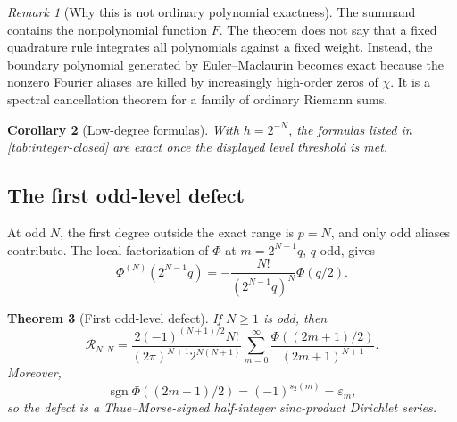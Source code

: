 \documentclass[11pt,oneside]{article}
\numberwithin{equation}{section}
\newtheorem{theorem}{Theorem}[section]
\newtheorem{corollary}[theorem]{Corollary}
\theoremstyle{definition}
\theoremstyle{remark}
\newtheorem{remark}[theorem]{Remark}
\newcommand{\wt}{s_2}
\newcommand{\defect}{\mathcal R}
\DeclareMathOperator{\sgn}{sgn}
\begin{document}
\begin{remark}[Why this is not ordinary polynomial exactness]
The summand contains the nonpolynomial function \(F\).  The theorem does not say that a
fixed quadrature rule integrates all polynomials against a fixed weight.  Instead, the
boundary polynomial generated by Euler--Maclaurin becomes exact because the nonzero
Fourier aliases are killed by increasingly high-order zeros of \(\chi\).  It is a
spectral cancellation theorem for a family of ordinary Riemann sums.
\end{remark}

\begin{corollary}[Low-degree formulas]\label{cor:low-degree}
With \(h=2^{-N}\), the formulas listed in \cref{tab:integer-closed} are exact once the displayed level threshold is met.
\end{corollary}

\begin{table}[H]
\centering
\small
\resizebox{\textwidth}{!}{}
\caption{Exact Euler--Maclaurin formulas generated and checked by the companion script.}
\label{tab:integer-closed}
\end{table}

\subsection{The first odd-level defect}

At odd \(N\), the first degree outside the exact range is \(p=N\), and only odd aliases
contribute.  The local factorization of \(\Phi\) at
\(m=2^{N-1}q\), \(q\) odd, gives
\begin{equation}
 \Phi^{(N)}(2^{N-1}q)
 =-\frac{N!}{(2^{N-1}q)^N}\Phi(q/2).
 \label{eq:leading-zero-jet}
\end{equation}

\begin{theorem}[First odd-level defect]
\label{thm:odd-defect}
If \(N\ge1\) is odd, then
\begin{equation}
 \boxed{\displaystyle
 \defect_{N,N}
 =\frac{2(-1)^{(N+1)/2}N!}
 {(2\pi)^{N+1}2^{N(N+1)}}
 \sum_{m=0}^{\infty}
 \frac{\Phi((2m+1)/2)}{(2m+1)^{N+1}}.}
 \label{eq:odd-defect-series}
\end{equation}
Moreover,
\begin{equation}
 \sgn\Phi((2m+1)/2)=(-1)^{\wt(m)}=\varepsilon_m,
 \label{eq:half-sign}
\end{equation}
so the defect is a Thue--Morse-signed half-integer sinc-product Dirichlet series.
\end{theorem}
\end{document}
